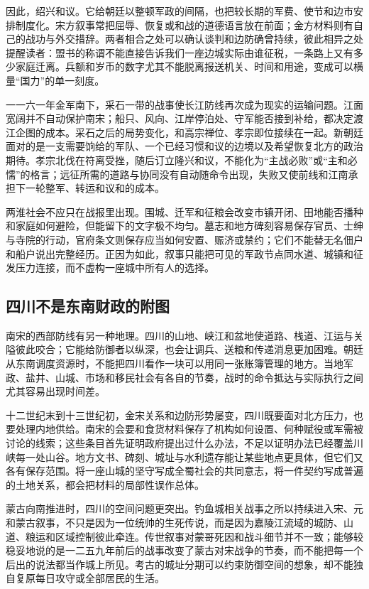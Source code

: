 因此，绍兴和议。它给朝廷以整顿军政的间隔，也把较长期的军费、使节和边市安排制度化。宋方叙事常把屈辱、恢复或和战的道德语言放在前面；金方材料则有自己的战功与外交措辞。两者相合之处可以确认谈判和边防确曾持续，彼此相异之处提醒读者：盟书的称谓不能直接告诉我们一座边城实际由谁征税，一条路上又有多少家庭迁离。兵额和岁币的数字尤其不能脱离报送机关、时间和用途，变成可以横量“国力”的单一刻度。

一一六一年金军南下，采石一带的战事使长江防线再次成为现实的运输问题。江面宽阔并不自动保护南宋；船只、风向、江岸停泊处、守军能否接到补给，都决定渡江企图的成本。采石之后的局势变化，和高宗禅位、孝宗即位接续在一起。新朝廷面对的是一支需要饷给的军队、一个已经习惯和议的边境以及希望恢复北方的政治期待。孝宗北伐在符离受挫，随后订立隆兴和议，不能化为“主战必败”或“主和必懦”的格言；远征所需的道路与协同没有自动随命令出现，失败又使前线和江南承担下一轮整军、转运和议和的成本。

两淮社会不应只在战报里出现。围城、迁军和征粮会改变市镇开闭、田地能否播种和家庭如何避险，但能留下的文字极不均匀。墓志和地方碑刻容易保存官员、士绅与寺院的行动，官府条文则保存应当如何安置、赈济或禁约；它们不能替无名佃户和船户说出完整经历。正因为如此，叙事只能把可见的军政节点同水道、城镇和征发压力连接，而不虚构一座城中所有人的选择。

\subsection{四川不是东南财政的附图}

南宋的西部防线有另一种地理。四川的山地、峡江和盆地使道路、栈道、江运与关隘彼此咬合；它能给防御者以纵深，也会让调兵、送粮和传递消息更加困难。朝廷从东南调度资源时，不能把四川看作一块可以用同一张账簿管理的地方。当地军政、盐井、山城、市场和移民社会有各自的节奏，战时的命令抵达与实际执行之间尤其容易出现时间差。

十二世纪末到十三世纪初，金宋关系和边防形势屡变，四川既要面对北方压力，也要处理内地供给。南宋的会要和食货材料保存了机构如何设置、何种赋役或军需被讨论的线索；这些条目首先证明政府提出过什么办法，不足以证明办法已经覆盖川峡每一处山谷。地方文书、碑刻、城址与水利遗存能让某些地点更具体，但它们又各有保存范围。将一座山城的坚守写成全蜀社会的共同意志，将一件契约写成普遍的土地关系，都会把材料的局部性误作总体。

蒙古向南推进时，四川的空间问题更突出。钓鱼城相关战事之所以持续进入宋、元和蒙古叙事，不只是因为一位统帅的生死传说，而是因为嘉陵江流域的城防、山道、粮运和区域控制彼此牵连。传世叙事对蒙哥死因和战斗细节并不一致；能够较稳妥地说的是一二五九年前后的战事改变了蒙古对宋战争的节奏，而不能把每一个后出的说法都当作城上所见。考古的城址分期可以约束防御空间的想象，却不能独自复原每日攻守或全部居民的生活。

